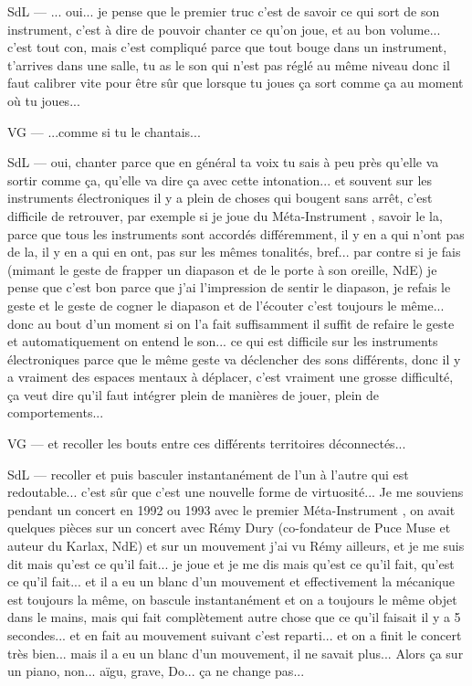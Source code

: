 SdL — ... oui... je pense que le premier truc c'est de savoir ce qui sort de son instrument, c'est à dire de pouvoir chanter ce qu'on joue, et au bon volume... c'est tout con, mais c'est compliqué parce que tout bouge dans un instrument, t'arrives dans une salle, tu as le son qui n'est pas réglé au même niveau donc il faut calibrer vite pour être sûr que lorsque tu joues ça sort comme ça au moment où tu joues... 

VG — ...comme si tu le chantais... 

SdL — oui, chanter parce que en général ta voix tu sais à peu près qu'elle va sortir comme ça, qu'elle va dire ça avec cette intonation... et souvent sur les instruments électroniques il y a plein de choses qui bougent sans arrêt, c'est difficile de retrouver, par exemple si je joue du Méta-Instrument , savoir le la, parce que tous les instruments sont accordés différemment, il y en a qui n'ont pas de la, il y en a qui en ont, pas sur les mêmes tonalités, bref... par contre si je fais (mimant le geste de frapper un diapason et de le porte à son oreille, NdE) je pense que c'est bon parce que j'ai l'impression de sentir le diapason, je refais le geste et le geste de cogner le diapason et de l'écouter c'est toujours le même... donc au bout d'un moment si on l'a fait suffisamment il suffit de refaire le geste et automatiquement on entend le son... ce qui est difficile sur les instruments électroniques parce que le même geste va déclencher des sons différents, donc il y a vraiment des espaces mentaux à déplacer, c'est vraiment une grosse difficulté, ça veut dire qu'il faut intégrer plein de manières de jouer, plein de comportements... 

VG — et recoller les bouts entre ces différents territoires déconnectés... 

SdL — recoller et puis basculer instantanément de l'un à l'autre qui est redoutable... c'est sûr que c'est une nouvelle forme de virtuosité... Je me souviens pendant un concert en 1992 ou 1993 avec le premier Méta-Instrument , on avait quelques pièces sur un concert avec Rémy Dury (co-fondateur de Puce Muse et auteur du Karlax, NdE) et sur un mouvement j'ai vu Rémy ailleurs, et je me suis dit mais qu'est ce qu'il fait... je joue et je me dis mais qu'est ce qu'il fait, qu'est ce qu'il fait... et il a eu un blanc d'un mouvement et effectivement la mécanique est toujours la même, on bascule instantanément et on a toujours le même objet dans le mains, mais qui fait complètement autre chose que ce qu'il faisait il y a 5 secondes... et en fait au mouvement suivant c'est reparti... et on a finit le concert très bien... mais il a eu un blanc d'un mouvement, il ne savait plus... Alors ça sur un piano, non... aïgu, grave, Do... ça ne change pas... 

